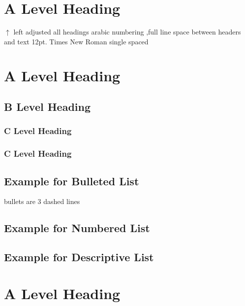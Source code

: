 \documentclass[12pt]{report}
\begin{document}
\normalsize
\flushleft
\singlespacing
\newpage
{}

\section{A Level Heading}

\color{red} $\uparrow$ left adjusted all headings arabic numbering ,full line space between headers and text \color{black}
\blindtext \cite{DBLP:journals/corr/JohnsonAL16} \color{red} 12pt. Times New Roman single spaced \color{black}
\section{A Level Heading}
\blindtext \cite{DBLP:journals/corr/RonnebergerFB15}
\subsection{B Level Heading}
\blindtext \cite{DBLP:journals/corr/abs-1803-09820}
\subsubsection{C Level Heading}
\blindtext
\subsubsection{C Level Heading}
\blindtext

\subsection{Example for Bulleted List}
\color{red} bullets are 3 dashed lines \color{black}
\blinditemize
\subsection{Example for Numbered List}
\blindenumerate
\subsection{Example for Descriptive List}
\blinddescription

\section{A Level Heading}
\blindtext
\end{document}
